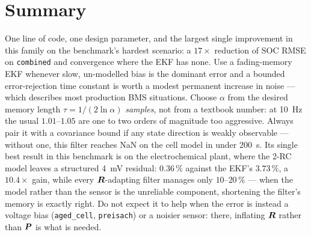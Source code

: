 \section{Summary}
One line of code, one design parameter, and the largest single improvement in this family on the
benchmark's hardest scenario: a $17\times$ reduction of SOC RMSE on \texttt{combined} and
convergence where the EKF has none.  Use a fading-memory EKF whenever slow, un-modelled bias is the
dominant error and a bounded error-rejection time constant is worth a modest permanent increase in
noise --- which describes most production BMS situations.  Choose $\alpha$ from the desired memory
length $\tau = 1/(2\ln\alpha)$ \emph{samples}, not from a textbook number: at \SI{10}{\hertz} the
usual $1.01$--$1.05$ are one to two orders of magnitude too aggressive.  Always pair it with a
covariance bound if any state direction is weakly observable --- without one, this filter reaches
NaN on the cell model in under \SI{200}{\second}.  Its single best result in this benchmark is on the electrochemical plant, where the 2-RC model
leaves a structured \SI{4}{\milli\volt} residual: $0.36\,\%$ against the EKF's $3.73\,\%$, a
$10.4\times$ gain, while every $\bm{R}$-adapting filter manages only $10$--$20\,\%$ --- when the model
rather than the sensor is the unreliable component, shortening the filter's memory is exactly right.
Do not expect it to help when the error is instead a voltage bias (\texttt{aged\_cell},
\texttt{preisach}) or a noisier sensor: there, inflating $\bm{R}$ rather than $\bm{P}$ is what is needed.
